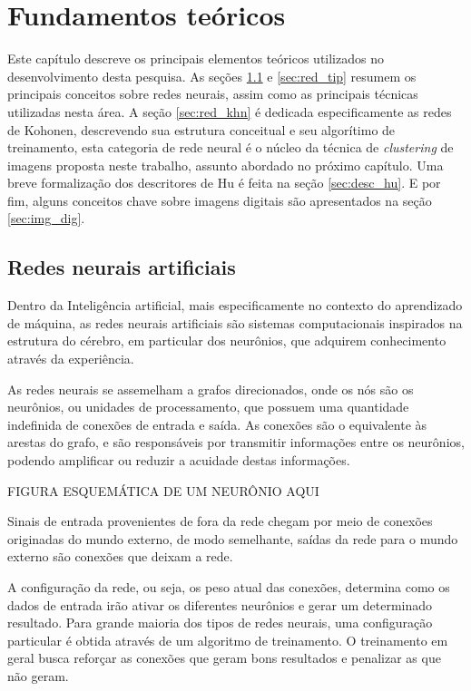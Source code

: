 \chapter{Fundamentos teóricos}

Este capítulo descreve os principais elementos teóricos utilizados no
desenvolvimento desta pesquisa. As seções \ref{sec:red_neu} e \ref{sec:red_tip}
resumem os principais conceitos sobre redes neurais, assim como as principais
técnicas utilizadas nesta área. A seção \ref{sec:red_khn} é dedicada
especificamente as redes de Kohonen, descrevendo sua estrutura conceitual e seu
algorítimo de treinamento, esta categoria de rede neural é o núcleo da técnica
de \textit{clustering} de imagens proposta neste trabalho, assunto abordado no
próximo capítulo. Uma breve formalização dos descritores de Hu é feita na seção
\ref{sec:desc_hu}. E por fim, alguns conceitos chave sobre imagens digitais são
apresentados na seção \ref{sec:img_dig}.

\section{Redes neurais artificiais}\label{sec:red_neu}

Dentro da Inteligência artificial, mais especificamente no contexto do
aprendizado de máquina, as redes neurais artificiais são sistemas computacionais
inspirados na estrutura do cérebro, em particular dos neurônios, que adquirem
conhecimento através da experiência.

As redes neurais se assemelham a grafos direcionados, onde os nós são os
neurônios, ou unidades de processamento, que possuem uma quantidade indefinida
de conexões de entrada e saída. As conexões são o equivalente às arestas do
grafo, e são responsáveis por transmitir informações entre os neurônios, podendo
amplificar ou reduzir a acuidade destas informações.

FIGURA ESQUEMÁTICA DE UM NEURÔNIO AQUI

Sinais de entrada provenientes de fora da rede chegam por meio de conexões
originadas do mundo externo, de modo semelhante, saídas da rede para o mundo
externo são conexões que deixam a rede.

A configuração da rede, ou seja, os peso atual das conexões, determina como os
dados de entrada irão ativar os diferentes neurônios e gerar um determinado
resultado. Para grande maioria dos tipos de redes neurais, uma configuração
particular é obtida através de um algoritmo de treinamento. O treinamento em
geral busca reforçar as conexões que geram bons resultados e penalizar as que
não geram.

